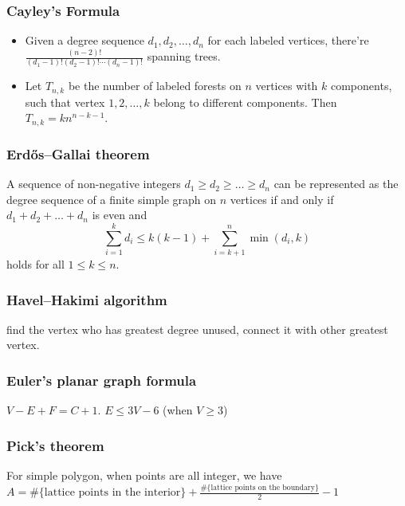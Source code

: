 \subsubsection{Cayley's Formula}
\begin{itemize}[nosep]
  \item Given a degree sequence $d_1, d_2, \ldots, d_n$ for each labeled vertices, there're $\frac{(n - 2)!}{(d_1 - 1)!(d_2 - 1)!\cdots(d_n - 1)!}$ spanning trees.
  \item Let $T_{n, k}$ be the number of labeled forests on $n$ vertices with $k$ components, such that vertex $1, 2, \ldots, k$ belong to different components. Then $T_{n, k} = kn^{n - k - 1}$.
\end{itemize}

\subsubsection{Erdős–Gallai theorem}
A sequence of non-negative integers $d_1 \geq d_2 \geq \ldots \geq d_n$ can be represented as the degree sequence of a finite simple graph on $n$ vertices if and only if $d_1 + d_2 + \ldots + d_n$ is even and
$$ \sum_{i = 1}^{k}d_i \leq k(k - 1) + \sum_{i = k + 1}^{n}\min(d_i, k) $$
holds for all $1 \leq k \leq n$.

\subsubsection{Havel–Hakimi algorithm}
find the vertex who has greatest degree unused, connect it with other greatest vertex.


\subsubsection{Euler's planar graph formula}
$V-E+F=C+1$. $E\leq 3V-6$ (when $V\geq 3$)

\subsubsection{Pick's theorem}
For simple polygon, when points are all integer, we have $A=\text{\#\{lattice points in the interior\}} + \frac{\text{\#\{lattice points on the boundary\}}}{2} - 1$

